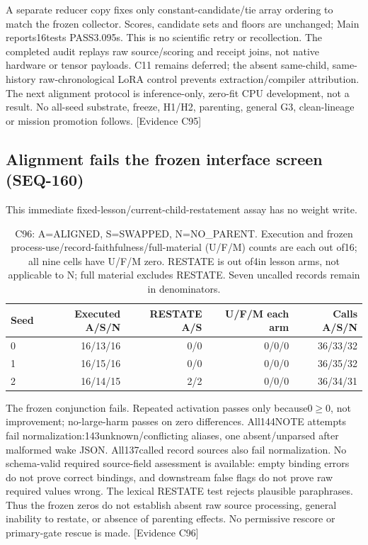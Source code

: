 \documentclass[11pt]{article}
\newcommand{\ev}[1]{\textsf{[Evidence #1]}}
\begin{document}
A separate reducer copy fixes only constant-candidate/tie array ordering to
match the frozen collector. Scores, candidate sets and floors are unchanged;
Main reports16tests PASS3.095s. This is no scientific retry or recollection.
The completed audit replays raw source/scoring and receipt joins, not native
hardware or tensor payloads. C11 remains deferred; the absent same-child,
same-history raw-chronological LoRA control prevents extraction/compiler
attribution. The next alignment protocol is inference-only, zero-fit CPU
development, not a result. No all-seed substrate, freeze, H1/H2, parenting,
general G3, clean-lineage or mission promotion follows. \ev{C95}


\subsection{Alignment fails the frozen interface screen (SEQ-160)}
\label{sec:seq160-alignment}
This immediate fixed-lesson/current-child-restatement assay has no weight write.
\begin{table}[htbp]
\centering\small
\begin{tabular}{lrrrr}
\toprule
Seed & Executed A/S/N & RESTATE A/S & U/F/M each arm & Calls A/S/N \\
\midrule
0 & 16/13/16 & 0/0 & 0/0/0 & 36/33/32 \\
1 & 16/15/16 & 0/0 & 0/0/0 & 36/35/32 \\
2 & 16/14/15 & 2/2 & 0/0/0 & 36/34/31 \\
\bottomrule
\end{tabular}
\caption{C96: A=ALIGNED, S=SWAPPED, N=NO\_PARENT. Execution and frozen
process-use/record-faithfulness/full-material (U/F/M) counts are each out of16;
all nine cells have U/F/M zero. RESTATE is out of4in lesson arms, not applicable
to N; full material excludes RESTATE. Seven uncalled records remain in denominators.}
\label{tab:seq160-alignment}
\end{table}
The frozen conjunction fails. Repeated activation passes only because0$\geq$0,
not improvement; no-large-harm passes on zero differences. All144NOTE attempts
fail normalization:143unknown/conflicting aliases, one absent/unparsed after
malformed wake JSON. All137called record sources also fail normalization.
No schema-valid required source-field assessment is available: empty binding
errors do not prove correct bindings, and downstream false flags do not prove
raw required values wrong. The lexical RESTATE test rejects plausible paraphrases.
Thus the frozen zeros do not establish absent raw source processing, general
inability to restate, or absence of parenting effects. No permissive rescore
or primary-gate rescue is made. \ev{C96}
\end{document}
